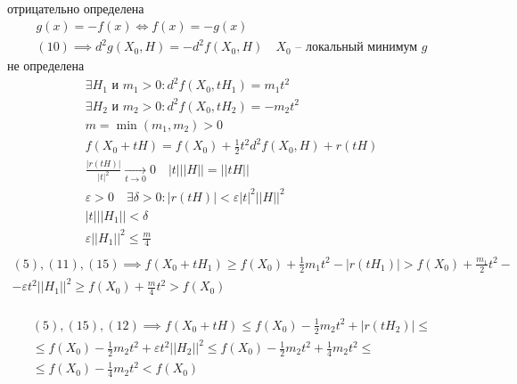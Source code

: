 \documentclass[main]{subfiles}
\begin{document}
\begin{longProof}
        отрицательно определена 
        \begin{gather*}
            g(x) = -f(x) \Leftrightarrow f(x) = - g(x) \\
            (10) \implies d^2g(X_0,H) = -d^2f(X_0,H) \quad X_0 \text{  -- локальный минимум } g \tag{10\prime}
        \end{gather*}
        не определена
        \begin{gather*}
            \exists H_1 \text{ и } m_1 > 0 : d^2f(X_0,tH_1) = m_1t^2 \tag{11}\\
            \exists H_2 \text{ и } m_2 > 0: d^2f(X_0,tH_2) = -m_2t^2 \tag{12} \\
            m = \min(m_1, m_2) > 0 \\
            f(X_0 + tH) = f(X_0) + \frac{1}{2} t^2 d^2f(X_0,H) + r(tH) \tag{13}\\
            \frac{|r(tH)|}{|t|^2} \underset{t \to 0}{\rightarrow} 0 \quad |t|||H|| = ||tH|| \tag{14} \\
            \varepsilon > 0 \quad \exists \delta > 0 : |r(tH)| < \varepsilon|t|^2||H||^2 \tag{15} \\
            |t|||H_1|| < \delta \\
            \varepsilon||H_1||^2 \leq \frac{m}{4} \tag{17} \\
        \end{gather*}
        \begin{multline*}
            (5), (11), (15) \implies f(X_0 + tH_1) \geq f(X_0) + \frac{1}{2} m_1t^2 - |r(tH_1)| > f(X_0) + \frac{m_1}{2}t^2 - \\
            - \varepsilon t^2||H_1||^2 \geq f(X_0) + \frac{m}{4}t^2 > f(X_0)  \tag{16} \\
        \end{multline*}

        \begin{multline*}
            (5), (15), (12) \implies f(X_0 + tH) \leq f(X_0) - \frac{1}{2} m_2t^2 + |r(tH_2)| \leq \\
            \leq f(X_0) - \frac{1}{2} m_2t^2 + \varepsilon t^2||H_2||^2 \leq f(X_0) - \frac{1}{2}m_2t^2 + \frac{1}{4}m_2t^2 \leq \\
            \leq f(X_0) - \frac{1}{4}m_2t^2 < f(X_0) \tag{18}
        \end{multline*}
\end{longProof}
\end{document}
